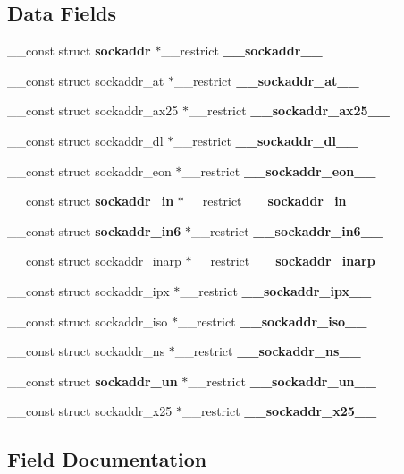 \subsection*{Data Fields}
\begin{DoxyCompactItemize}
\item 
\_\-\_\-const struct {\bf sockaddr} $\ast$\_\-\_\-restrict {\bf \_\-\_\-sockaddr\_\-\_\-}
\item 
\_\-\_\-const struct sockaddr\_\-at $\ast$\_\-\_\-restrict {\bf \_\-\_\-sockaddr\_\-at\_\-\_\-}
\item 
\_\-\_\-const struct sockaddr\_\-ax25 $\ast$\_\-\_\-restrict {\bf \_\-\_\-sockaddr\_\-ax25\_\-\_\-}
\item 
\_\-\_\-const struct sockaddr\_\-dl $\ast$\_\-\_\-restrict {\bf \_\-\_\-sockaddr\_\-dl\_\-\_\-}
\item 
\_\-\_\-const struct sockaddr\_\-eon $\ast$\_\-\_\-restrict {\bf \_\-\_\-sockaddr\_\-eon\_\-\_\-}
\item 
\_\-\_\-const struct {\bf sockaddr\_\-in} $\ast$\_\-\_\-restrict {\bf \_\-\_\-sockaddr\_\-in\_\-\_\-}
\item 
\_\-\_\-const struct {\bf sockaddr\_\-in6} $\ast$\_\-\_\-restrict {\bf \_\-\_\-sockaddr\_\-in6\_\-\_\-}
\item 
\_\-\_\-const struct sockaddr\_\-inarp $\ast$\_\-\_\-restrict {\bf \_\-\_\-sockaddr\_\-inarp\_\-\_\-}
\item 
\_\-\_\-const struct sockaddr\_\-ipx $\ast$\_\-\_\-restrict {\bf \_\-\_\-sockaddr\_\-ipx\_\-\_\-}
\item 
\_\-\_\-const struct sockaddr\_\-iso $\ast$\_\-\_\-restrict {\bf \_\-\_\-sockaddr\_\-iso\_\-\_\-}
\item 
\_\-\_\-const struct sockaddr\_\-ns $\ast$\_\-\_\-restrict {\bf \_\-\_\-sockaddr\_\-ns\_\-\_\-}
\item 
\_\-\_\-const struct {\bf sockaddr\_\-un} $\ast$\_\-\_\-restrict {\bf \_\-\_\-sockaddr\_\-un\_\-\_\-}
\item 
\_\-\_\-const struct sockaddr\_\-x25 $\ast$\_\-\_\-restrict {\bf \_\-\_\-sockaddr\_\-x25\_\-\_\-}
\end{DoxyCompactItemize}


\subsection{Field Documentation}
